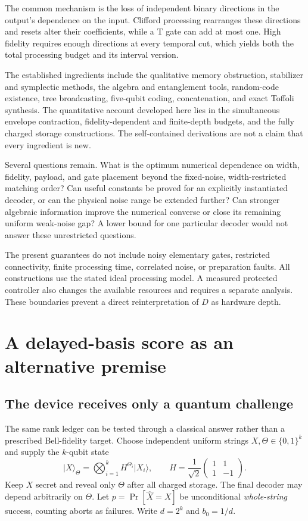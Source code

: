 \documentclass[11pt,a4paper]{article}
\numberwithin{equation}{section}
\theoremstyle{remark}\newtheorem*{remark}{Interpretation}
\newcommand{\ket}[1]{\lvert#1\rangle}
\begin{document}
The common mechanism is the loss of independent binary directions in the output's dependence on the input. Clifford processing rearranges these directions and resets alter their coefficients, while a T gate can add at most one. High fidelity requires enough directions at every temporal cut, which yields both the total processing budget and its interval version.

The established ingredients include the qualitative memory obstruction, stabilizer and symplectic methods, the algebra and entanglement tools, random-code existence, tree broadcasting, five-qubit coding, concatenation, and exact Toffoli synthesis. The quantitative account developed here lies in the simultaneous envelope contraction, fidelity-dependent and finite-depth budgets, and the fully charged storage constructions. The self-contained derivations are not a claim that every ingredient is new.

Several questions remain. What is the optimum numerical dependence on width, fidelity, payload, and gate placement beyond the fixed-noise, width-restricted matching order? Can useful constants be proved for an explicitly instantiated decoder, or can the physical noise range be extended further? Can stronger algebraic information improve the numerical converse or close its remaining uniform weak-noise gap? A lower bound for one particular decoder would not answer these unrestricted questions.

The present guarantees do not include noisy elementary gates, restricted connectivity, finite processing time, correlated noise, or preparation faults. All constructions use the stated ideal processing model. A measured protected controller also changes the available resources and requires a separate analysis. These boundaries prevent a direct reinterpretation of $D$ as hardware depth.

\section{A delayed-basis score as an alternative premise}
\label{sec:guessing}
\subsection{The device receives only a quantum challenge}
The same rank ledger can be tested through a classical answer rather than a prescribed Bell-fidelity target. Choose independent uniform strings $X,\Theta\in\{0,1\}^k$ and supply the $k$-qubit state
\[
\ket X_\Theta=\bigotimes_{i=1}^k H^{\Theta_i}\ket{X_i},
\qquad H=\frac1{\sqrt2}\begin{pmatrix}1&1\\1&-1\end{pmatrix}.
\]
Keep $X$ secret and reveal only $\Theta$ after all charged storage. The final decoder may depend arbitrarily on $\Theta$. Let $p=\Pr[\widehat X=X]$ be unconditional \emph{whole-string} success, counting aborts as failures. Write $d=2^k$ and $b_0=1/d$.
\end{document}

